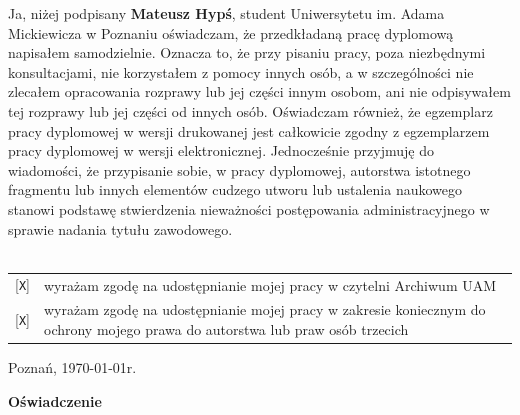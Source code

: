 \documentclass[oneside,polski,logo]{amuthesis}
\begin{document}
Ja, niżej podpisany \textbf{Mateusz Hypś}, student Uniwersytetu im. Adama Mickiewicza w Poznaniu oświadczam, że przedkładaną pracę dyplomową napisałem samodzielnie.
Oznacza to, że przy pisaniu pracy, poza niezbędnymi konsultacjami, nie korzystałem z pomocy innych osób, a w szczególności nie zlecałem opracowania rozprawy lub jej części innym osobom, ani nie odpisywałem tej rozprawy lub jej części od innych osób.
Oświadczam również, że egzemplarz pracy dyplomowej w wersji drukowanej jest całkowicie zgodny z egzemplarzem pracy dyplomowej w wersji elektronicznej.
Jednocześnie przyjmuję do wiadomości, że przypisanie sobie, w pracy dyplomowej, autorstwa istotnego fragmentu lub innych elementów cudzego utworu lub ustalenia naukowego stanowi podstawę stwierdzenia nieważności postępowania administracyjnego w sprawie nadania tytułu zawodowego.
  \vspace{2cm}%
  \\ \\
  \small\noindent\begin{tabularx}{\textwidth}{@{}lX}
  {[\texttt{\uppercase{X}}]} & wyra\.zam zgod\k{e} na udost\k{e}pnianie mojej pracy w czytelni Archiwum UAM\\[1ex]
  {[\texttt{\uppercase{X}}]} & wyra\.zam zgod\k{e} na udost\k{e}pnianie mojej pracy w zakresie koniecznym do ochrony mojego prawa do autorstwa lub praw os\'ob trzecich\\
  \end{tabularx}
\clearpage

\begin{flushright} Poznań, \today r. \end{flushright}

\begin{center}
    \Large
    \textbf{Oświadczenie}
 \end{center}
\vspace{0.4cm}
\end{document}
